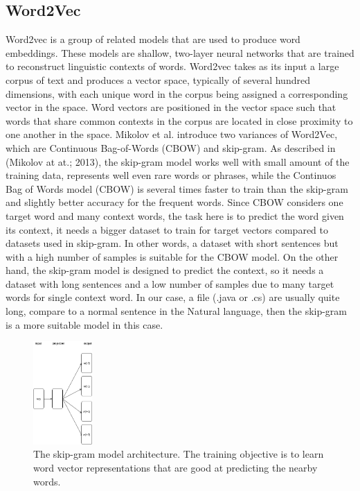 \subsection{Word2Vec}

Word2vec is a group of related models that are used to produce word embeddings. These models are shallow, two-layer neural networks that are trained to reconstruct linguistic contexts of words. Word2vec takes as its input a large corpus of text and produces a vector space, typically of several hundred dimensions, with each unique word in the corpus being assigned a corresponding vector in the space. Word vectors are positioned in the vector space such that words that share common contexts in the corpus are located in close proximity to one another in the space. Mikolov et al.\cite{mikolov2013distributed} introduce two variances of Word2Vec, which are Continuous Bag-of-Words (CBOW) and skip-gram. 
As described in (Mikolov at at.; 2013)\cite{mikolov2013distributed}, the skip-gram model works well with small amount of the training data, represents well even rare words or phrases, while the Continuos Bag of Words model (CBOW) is several times faster to train than the skip-gram and slightly better accuracy for the frequent words. Since CBOW considers one target word and many context words, the task here is to predict the word given its context, it needs a bigger dataset to train for target vectors compared to datasets used in skip-gram. In other words, a dataset with short sentences but with a high number of samples is suitable for the CBOW model. On the other hand, the skip-gram model is designed to predict the context, so it needs a dataset with long sentences and a low number of samples due to many target words for single context word. In our case, a file (.java or .cs) are usually quite long, compare to a normal sentence in the Natural language, then the skip-gram is a more suitable model in this case. 



\begin{figure}[t!]
	
	\includegraphics[width=0.20\textwidth]{skipgram}
	\caption{The skip-gram model architecture. The training objective is to learn word vector representations that are good at predicting the nearby words.}
	\label{fig:clf}
\end{figure}

